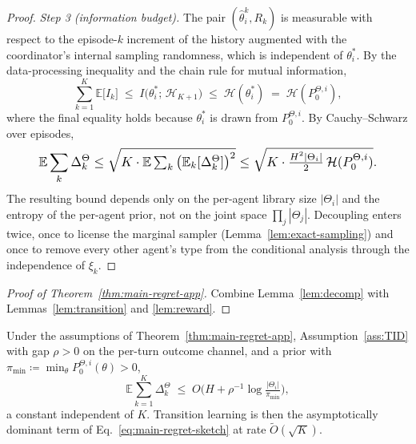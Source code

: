 \begin{proof}
\emph{Step 3 (information budget).} The pair $(\hat\theta_i^k, R_k)$ is measurable with respect to the episode-$k$ increment of the history augmented with the coordinator's internal sampling randomness, which is independent of $\theta_i^*$. By the data-processing inequality and the chain rule for mutual information,
\begin{equation*}
\sum_{k=1}^K \mathbb{E}\big[I_k\big] \;\le\; I\big(\theta_i^*;\, \mathcal H_{K+1}\big) \;\le\; \mathcal H(\theta_i^*) \;=\; \mathcal H(P_0^{\Theta,i}),
\end{equation*}
where the final equality holds because $\theta_i^*$ is drawn from $P_0^{\Theta,i}$. By Cauchy--Schwarz over episodes,
\begin{equation*}\resizebox{0.88\linewidth}{!}{$\displaystyle \mathbb{E}\sum_{k} \Delta_k^\Theta \le \sqrt{K \cdot \mathbb{E}\textstyle\sum_k \big(\mathbb{E}_k[\Delta_k^\Theta]\big)^2} \le \sqrt{K \cdot \tfrac{H^2|\Theta_i|}{2}\, \mathcal H(P_0^{\Theta,i})}. $}\end{equation*}
The resulting bound depends only on the per-agent library size $|\Theta_i|$ and the entropy of the per-agent prior, not on the joint space $\prod_j |\Theta_j|$. Decoupling enters twice, once to license the marginal sampler (Lemma~\ref{lem:exact-sampling}) and once to remove every other agent's type from the conditional analysis through the independence of $\xi_k$.
\end{proof}

\begin{proof}[Proof of Theorem~\ref{thm:main-regret-app}]
Combine Lemma~\ref{lem:decomp} with Lemmas~\ref{lem:transition} and \ref{lem:reward}.
\end{proof}

\begin{proposition}
\label{prop:tid-collapse}
Under the assumptions of Theorem~\ref{thm:main-regret-app}, Assumption~\ref{ass:TID} with gap $\rho > 0$ on the per-turn outcome channel, and a prior with $\pi_{\min} \coloneqq \min_\theta P_0^{\Theta,i}(\theta) > 0$,
\begin{equation*}
\mathbb{E}\sum_{k=1}^K \Delta_k^\Theta \;\le\; O\Big(H + \rho^{-1}\log\tfrac{|\Theta_i|}{\pi_{\min}}\Big),
\end{equation*}
a constant independent of $K$. Transition learning is then the asymptotically dominant term of Eq.~\eqref{eq:main-regret-sketch} at rate $\tilde O(\sqrt K)$.
\end{proposition}

